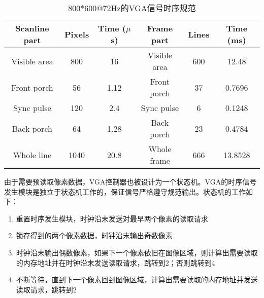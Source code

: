 \begin{table}[htbp]
\centering
\caption{800*600@72Hz的VGA信号时序规范}
\label{tab:vga_timing}
\begin{tabular}{@{}|c|c|c||c|c|c|@{}}
  \hline
  \textbf{Scanline part}                       & \textbf{Pixels} & \textbf{Time ($\mu$s)} & \textbf{Frame part} & \textbf{Lines} & \textbf{Time (ms)} \\ \hline
  Visible area                                 & 800             & 16                     & Visible area        & 600            & 12.48              \\ 
  Front porch                                  & 56              & 1.12                   & Front porch         & 37             & 0.7696             \\ 
  Sync pulse                                   & 120             & 2.4                    & Sync pulse          & 6              & 0.1248             \\ 
  Back porch                                   & 64              & 1.28                   & Back porch          & 23             & 0.4784             \\ \hline
  Whole line                                   & 1040            & 20.8                   & Whole frame         & 666            & 13.8528            \\ \hline
\end{tabular}
\end{table}

由于需要预读取像素数据，VGA控制器也被设计为一个状态机。VGA的时序信号发生模块是独立于状态机工作的，保证信号严格遵守规范输出。状态机的工作如下：
\begin{enumerate}
  \item 重置时序发生模块，时钟沿末发送对最早两个像素的读取请求
  \item 锁存得到的两个像素数据，时钟沿末输出奇数像素
  \item 时钟沿末输出偶数像素，如果下一个像素依旧在图像区域，则计算出需要读取的内存地址并在时钟沿末发送读取请求，跳转到2；否则跳转到4
  \item 不断等待，直到下一个像素回到图像区域，计算出需要读取的内存地址并发送读取请求，跳转到2
\end{enumerate}
  